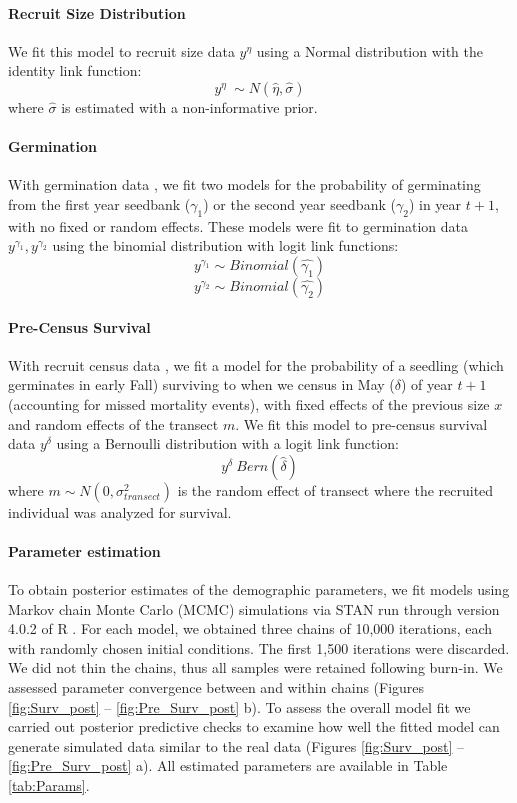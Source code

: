\documentclass[11pt]{article}
\begin{document}
\paragraph{Recruit Size Distribution}
We fit this model to recruit size data $y^{\eta}$ using a Normal distribution with the identity link function: 
$$y^{\eta} ~\sim N(\hat{\eta},\hat{\sigma})$$
where $\hat{\sigma}$ is estimated with a non-informative prior. 

\paragraph{Germination}
With germination data \cite{Miller2007}, we fit two models for the probability of germinating from the first year seedbank ($\gamma_1$) or the second year seedbank ($\gamma_2$) in year $t+1$, with no fixed or random effects.
These models were fit to germination data $y^{\gamma_1}, y^{\gamma_2}$  using the binomial distribution with logit link functions:
$$y^{\gamma_1} \sim Binomial(\hat{\gamma_1})$$
$$y^{\gamma_2} \sim Binomial(\hat{\gamma_2})$$

\paragraph{Pre-Census Survival}
With recruit census data \cite{Miller2006}, we fit a model for the probability of a seedling (which germinates in early Fall) surviving to when we census in May ($\delta$) of year $t+1$ (accounting for missed mortality events), with fixed effects of the previous size $x$ and random effects of the transect $m$.
We fit this model to pre-census survival data $y^{\delta}$ using a Bernoulli distribution with a logit link function: 
$$y^{\delta} ~ Bern(\hat{\delta})$$
 where $m \sim N(0, \sigma_{transect}^2)$ is the random effect of transect where the recruited individual was analyzed for survival.

\paragraph{Parameter estimation}
To obtain posterior estimates of the demographic parameters, we fit models using Markov chain Monte Carlo (MCMC) simulations via STAN run through version 4.0.2 of R \cite{Rcite,Rstancite}. 
For each model, we obtained three chains of 10,000 iterations, each with randomly chosen initial conditions. 
The first 1,500 iterations were discarded. 
We did not thin the chains, thus all samples were retained following burn-in. 
We assessed parameter convergence between and within chains (Figures \ref{fig:Surv_post} -- \ref{fig:Pre_Surv_post} b). 
To assess the overall model fit we carried out posterior predictive checks to examine how well the fitted model can generate simulated data similar to the real data (Figures \ref{fig:Surv_post} -- \ref{fig:Pre_Surv_post} a).
All estimated parameters are available in Table \ref{tab:Params}.
\end{document}

